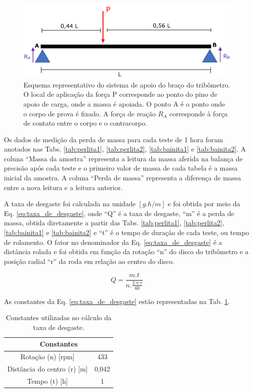 \documentclass[
12pt,
openany, %
oneside, %
a4paper,			
english,			
brazil			        %
]{abntbibufjf}
\begin{document}
	\begin{figure}[H]
		\centering
		\includegraphics[width=1\textwidth]{apoio_tribometro}
		\caption{Esquema representativo do sistema de apoio do braço do tribômetro. O local de aplicação da força P corresponde ao ponto do pino de apoio de carga, onde a massa é apoiada. O ponto A é o ponto onde o corpo de prova é fixado. A força de reação $R_A$ corresponde à força de contato entre o corpo e o contracorpo.}
		\label{fig:apoio_tribometro}
	\end{figure}

	Os dados de medição da perda de massa para cada teste de 1 hora foram anotados nas Tabs. \ref{tab:perlita1}, \ref{tab:perlita2}, \ref{tab:bainita1} e \ref{tab:bainita2}. A coluna ``Massa da amostra'' representa a leitura da massa aferida na balança de precisão após cada teste e o primeiro valor de massa de cada tabela é a massa inicial da amostra. A coluna ``Perda de massa'' representa a diferença de massa entre a nova leitura e a leitura anterior. 
	
	A taxa de desgaste foi calculada na unidade $[{g.h}/m]$ e foi obtida por meio da Eq. \ref{eq:taxa_de_desgaste}, onde ``Q'' é a taxa de desgaste, ``m'' é a perda de massa, obtida diretamente a partir das Tabs. \ref{tab:perlita1}, \ref{tab:perlita2}, \ref{tab:bainita1} e \ref{tab:bainita2} e ``t'' é o tempo de duração de cada teste, ou tempo de rolamento. O fator no denominador da Eq. \ref{eq:taxa_de_desgaste} é a distância rolada e foi obtida em função da rotação ``n'' do disco do tribômetro e a posição radial ``r'' da roda em relação ao centro do disco.
	

	\begin{equation} \label{eq:taxa_de_desgaste}
	Q = \frac{m.t}{n.\frac{2.\pi.r}{60}}
	\end{equation}

	
	As constantes da Eq. \ref{eq:taxa_de_desgaste} estão representadas na Tab. \ref{tab:constantes}.
	\begin{table}[H]
		\centering
		\caption{Constantes utilizadas no cálculo da taxa de desgaste.}
		\begin{tabular}{|cc|}
			\hline
			\multicolumn{2}{|c|}{\textbf{Constantes}} \bigstrut\\
			\hline
			Rotação (n) [rpm] & 433 \bigstrut[t]\\
			Distância do centro (r) [m] & 0,042 \\
			Tempo (t) [h] & 1 \bigstrut[b]\\
			\hline
		\end{tabular}%
		\label{tab:constantes}%
	\end{table}%
	
\end{document}
